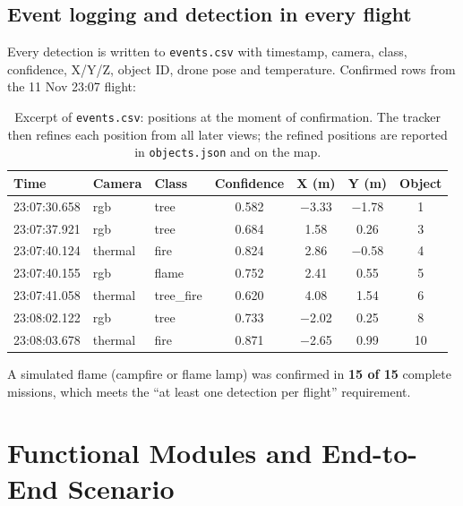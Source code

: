 \documentclass[10pt,a4paper]{article}
\newcommand{\head}[1]{\textbf{#1}}
\newcommand{\file}[1]{\texttt{\small #1}}
\begin{document}
\subsection{Event logging and detection in every flight}
Every detection is written to \file{events.csv} with timestamp, camera, class, confidence, X/Y/Z, object ID, drone pose and
temperature. Confirmed rows from the 11 Nov 23:07 flight:

\begin{table}[H]
\centering\small
\begin{tabular}{|l|l|l|c|c|c|c|}
\hline
\rowcolor{headgray}\head{Time} & \head{Camera} & \head{Class} & \head{Confidence} & \head{X (m)} & \head{Y (m)} & \head{Object} \\ \hline
23:07:30.658 & rgb & tree & 0.582 & $-$3.33 & $-$1.78 & 1 \\ \hline
23:07:37.921 & rgb & tree & 0.684 & 1.58 & 0.26 & 3 \\ \hline
23:07:40.124 & thermal & fire & 0.824 & 2.86 & $-$0.58 & 4 \\ \hline
23:07:40.155 & rgb & flame & 0.752 & 2.41 & 0.55 & 5 \\ \hline
23:07:41.058 & thermal & tree\_fire & 0.620 & 4.08 & 1.54 & 6 \\ \hline
23:08:02.122 & rgb & tree & 0.733 & $-$2.02 & 0.25 & 8 \\ \hline
23:08:03.678 & thermal & fire & 0.871 & $-$2.65 & 0.99 & 10 \\ \hline
\end{tabular}
\caption{Excerpt of \file{events.csv}: positions at the moment of confirmation. The tracker then refines each position
from all later views; the refined positions are reported in \file{objects.json} and on the map.}
\end{table}

A simulated flame (campfire or flame lamp) was confirmed in \textbf{15 of 15} complete missions, which meets the
``at least one detection per flight'' requirement.

\section{Functional Modules and End-to-End Scenario}
\end{document}
